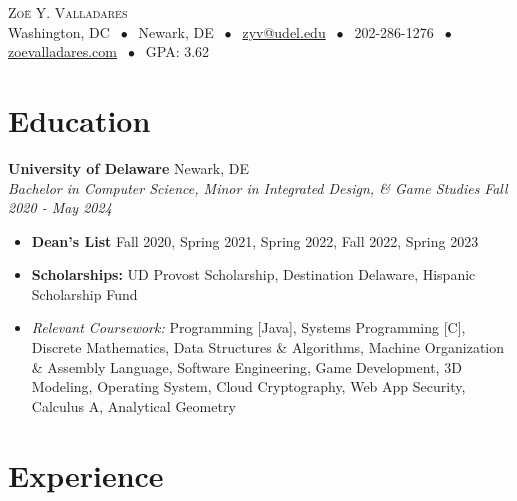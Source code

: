 \documentclass[letterpaper,10pt]{article}
\newcommand{\entry}[4]{%
  \vspace{2pt}
  \noindent\textbf{#1} \hfill #2 \\
  \noindent\textit{#3} \hfill \textit{#4}\par
  \vspace{-2pt}
}
\begin{document}
\begin{center}
  {\Huge \scshape Zoë Y. Valladares} \\[1pt]
  Washington, DC $\;\bullet\;$ Newark, DE $\;\bullet\;$
  \href{mailto:zyv@udel.edu}{zyv@udel.edu} $\;\bullet\;$ 
  202-286-1276 $\;\bullet\;$ \href{https://zoevalladares.com}{zoevalladares.com} $\;\bullet\;$ GPA: 3.62
\end{center}

\section{Education}

\entry{University of Delaware}{Newark, DE}
      {Bachelor in Computer Science, Minor in Integrated Design, \& Game Studies}{Fall 2020 - May 2024}
      \begin{itemize}
        \item \textbf{Dean’s List} Fall 2020, Spring 2021, Spring 2022, Fall 2022, Spring 2023
        \item \textbf{Scholarships:} UD Provost Scholarship, Destination Delaware, Hispanic Scholarship Fund
        \item[] \textit{Relevant Coursework:} Programming [Java], Systems Programming [C], Discrete Mathematics, Data Structures \& Algorithms, Machine Organization \&
          Assembly Language, Software Engineering, Game Development, 3D Modeling, Operating System, Cloud Cryptography, Web App Security, Calculus A, Analytical Geometry
      \end{itemize}

\section{Experience}
\end{document}
